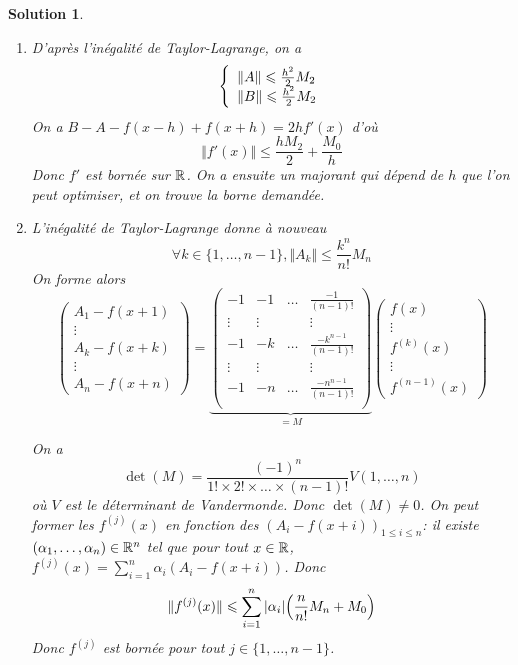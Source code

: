 \documentclass[12pt]{article}
\newtheorem{solution}{Solution}[section]
\theoremstyle{remark}
\numberwithin{equation}{section}
\begin{document}
\begin{solution}
	\phantom{}
	\begin{enumerate}
		\item D'après l'inégalité de Taylor-Lagrange, on a 
		$$
		\left\{
			\begin{array}[]{l}
				\Vert A\Vert\leqslant\frac{h^{2}}{2}M_{2}\\
				\Vert B\Vert\leqslant\frac{h^{2}}{2}M_{2}
			\end{array}
		\right.
		$$
		On a $B-A-f(x-h)+f(x+h)=2hf'(x)$ d'où 
		$$\Vert f'(x)\Vert\leqslant\frac{hM_{2}}{2}+\frac{M_{0}}{h}$$
		Donc $f'$ est bornée sur $\mathbb{R}$. On a ensuite un majorant qui dépend de $h$ que l'on peut optimiser, et on trouve la borne demandée.

		\item L'inégalité de Taylor-Lagrange donne à nouveau
		$$\forall k\in\{1,\dots,n-1\},\Vert A_{k}\Vert\leqslant\frac{k^{n}}{n!}M_{n}$$
		On forme alors
		$$
		\begin{pmatrix}
			A_{1}-f(x+1)\\
			\vdots\\
			A_{k}-f(x+k)\\
			\vdots\\
			A_{n}-f(x+n)
		\end{pmatrix}
		=
		\underbrace{
		\begin{pmatrix}
			-1 & -1 & \dots & \frac{-1}{(n-1)!}\\
			\vdots & \vdots & & \vdots\\
			-1 & -k & \dots & \frac{-k^{n-1}}{(n-1)!}\\
			\vdots & \vdots & & \vdots\\
			-1 & -n & \dots & \frac{-n^{n-1}}{(n-1)!}\\
		\end{pmatrix}}_{=M}
		\begin{pmatrix}
			f(x)\\
			\vdots\\
			f^{(k)}(x)\\
			\vdots\\
			f^{(n-1)}(x)
		\end{pmatrix}
		$$

		On a 
		$$\det(M)=\frac{(-1)^{n}}{1!\times 2!\times\dots\times (n-1)!}V(1,\dots,n)$$
		où $V$ est le déterminant de Vandermonde. Donc $\det(M)\neq0$. On peut former les $f^{(j)}(x)$ en fonction des $(A_{i}-f(x+i))_{1\leqslant i\leqslant n}$: il existe $(\alpha_{1},\dots,\alpha_{n})\in\mathbb{R}^{n}$ tel que pour tout $x\in\mathbb{R}$, $f^{(j)}(x)=\sum_{i=1}^{n}\alpha_{i}(A_{i}-f(x+i))$. Donc 
		$$\Vert f^{(j)}(x)\Vert\leqslant\sum_{i=1}^{n}\vert\alpha_{i}\vert\Bigl(\frac{n}{n!}M_{n}+M_{0}\Bigr)$$
		Donc $f^{(j)}$ est bornée pour tout $j\in\{1,\dots,n-1\}$.
	\end{enumerate}
\end{solution}
\end{document}
